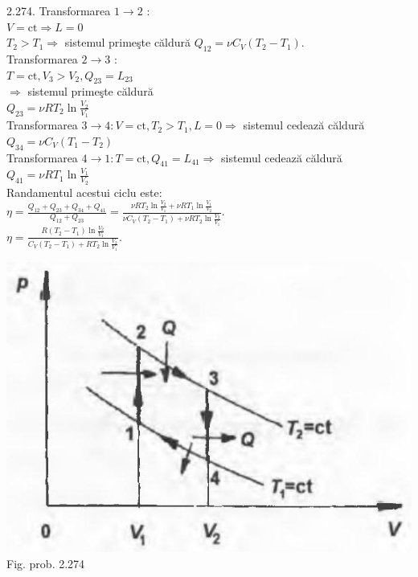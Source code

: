 2.274. Transformarea $1 \rightarrow 2$ :\\ $V=\mathrm{ct} \Rightarrow L=0$\\ $T_{2}>T_{1} \Rightarrow$ sistemul primeşte căldură $Q_{12}=\nu C_{V}\left(T_{2}-T_{1}\right)$.\\ Transformarea $2 \rightarrow 3$ :\\ $T=\mathrm{ct}, V_{3}>V_{2}, Q_{23}=L_{23}$\\ $\Rightarrow$ sistemul primeşte căldură\\ $Q_{23}=\nu R T_{2} \ln \frac{V_{2}}{V_{1}}$\\ Transformarea $3 \rightarrow 4: V=\mathrm{ct}, T_{2}>T_{1}, L=0 \Rightarrow$ sistemul cedează căldură\\ $Q_{34}=\nu C_{V}\left(T_{1}-T_{2}\right)$\\ Transformarea $4 \rightarrow 1: T=\mathrm{ct}, Q_{41}=L_{41} \Rightarrow$ sistemul cedează căldură\\ $Q_{41}=\nu R T_{1} \ln \frac{V_{1}}{V_{2}}$\\ Randamentul acestui ciclu este:\\ $\eta=\frac{Q_{12}+Q_{23}+Q_{34}+Q_{41}}{Q_{12}+Q_{23}}=\frac{\nu R T_{2} \ln \frac{V_{2}}{V_{1}}+\nu R T_{1} \ln \frac{V_{1}}{V_{2}}}{\nu C_{V}\left(T_{2}-T_{1}\right)+\nu R T_{2} \ln \frac{V_{2}}{V_{1}}}$.\\ $\eta=\frac{R\left(T_{2}-T_{1}\right) \ln \frac{V_{2}}{V_{1}}}{C_{V}\left(T_{2}-T_{1}\right)+R T_{2} \ln \frac{V_{2}}{V_{1}}} $.\\ \begin{center} \includegraphics[width=0.4\linewidth]{images/2025_07_01_5b3ff9fa0d508c8e9f17g-330}\\ Fig. prob. 2.274 \end{center}\\

